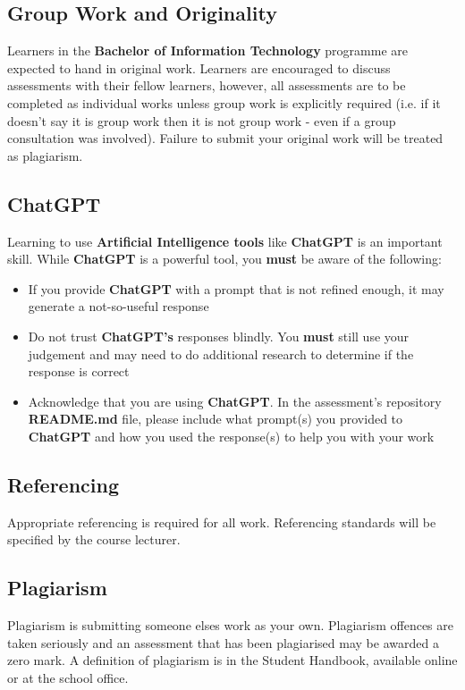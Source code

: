 \documentclass{article}
\begin{document}
\subsection*{Group Work and Originality}
Learners in the \textbf{Bachelor of Information Technology} programme are expected to hand in original work. Learners are encouraged to discuss assessments with their fellow learners, however, all assessments are to be completed as individual works unless group work is explicitly required (i.e. if it doesn't say it is group work then it is not group work - even if a group consultation was involved). Failure to submit your original work will be treated as plagiarism.

\subsection*{ChatGPT}
Learning to use \textbf{Artificial Intelligence tools} like \textbf{ChatGPT} is an important skill. While \textbf{ChatGPT} is a powerful tool, you \textbf{must} be aware of the following:

\begin{itemize}
    \item If you provide \textbf{ChatGPT} with a prompt that is not refined enough, it may generate a not-so-useful response
    \item Do not trust \textbf{ChatGPT's} responses blindly. You \textbf{must} still use your judgement and may need to do additional research to determine if the response is correct
    \item Acknowledge that you are using \textbf{ChatGPT}. In the assessment's repository \textbf{README.md} file, please include what prompt(s) you provided to \textbf{ChatGPT} and how you used the response(s) to help you with your work
\end{itemize}

\subsection*{Referencing}
Appropriate referencing is required for all work. Referencing standards will be specified by the course lecturer.

\subsection*{Plagiarism}
Plagiarism is submitting someone elses work as your own. Plagiarism offences are taken seriously and an assessment that has been plagiarised may be awarded a zero mark. A definition of plagiarism is in the Student Handbook, available online or at the school office.
\end{document}
